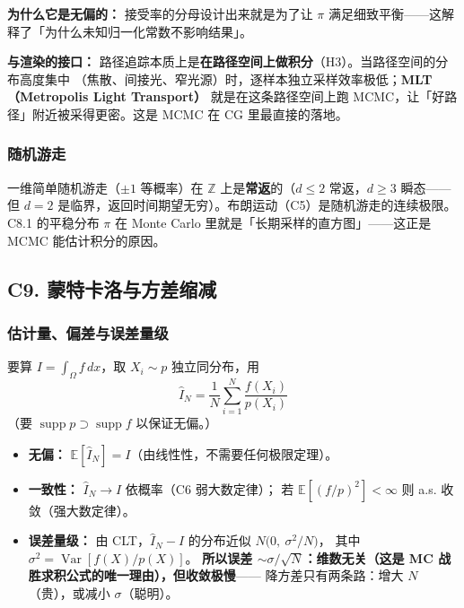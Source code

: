 \textbf{为什么它是无偏的：} 接受率的分母设计出来就是为了让 $\pi$ 满足细致平衡——这解释了「为什么未知归一化常数不影响结果」。

\textbf{与渲染的接口：} 路径追踪本质上是\textbf{在路径空间上做积分}（H3）。当路径空间的分布高度集中
（焦散、间接光、窄光源）时，逐样本独立采样效率极低；\textbf{MLT（Metropolis Light Transport）}
就是在这条路径空间上跑 MCMC，让「好路径」附近被采得更密。这是 MCMC 在 CG 里最直接的落地。

\subsubsection{随机游走}

一维简单随机游走（$\pm1$ 等概率）在 $\mathbb Z$ 上是\textbf{常返}的（$d\le2$ 常返，$d\ge3$ 瞬态——
但 $d=2$ 是临界，返回时间期望无穷）。布朗运动（C5）是随机游走的连续极限。
C8.1 的平稳分布 $\pi$ 在 Monte Carlo 里就是「长期采样的直方图」——这正是 MCMC 能估计积分的原因。

\subsection{C9. 蒙特卡洛与方差缩减}

\subsubsection{估计量、偏差与误差量级}

要算 $I=\int_\Omega f\,dx$，取 $X_i\sim p$ 独立同分布，用
\[
\hat I_N=\frac1N\sum_{i=1}^N\frac{f(X_i)}{p(X_i)}
\]
（要 $\operatorname{supp}p\supset\operatorname{supp}f$ 以保证无偏。）

\begin{itemize}
  \item \textbf{无偏：} $\mathbb E[\hat I_N]=I$（由线性性，不需要任何极限定理）。
  \item \textbf{一致性：} $\hat I_N\to I$ 依概率（C6 弱大数定律）；
        若 $\mathbb E[(f/p)^2]<\infty$ 则 a.s. 收敛（强大数定律）。
  \item \textbf{误差量级：} 由 CLT，$\hat I_N-I$ 的分布近似 $N\!\big(0,\ \sigma^2/N\big)$，
        其中 $\sigma^2=\operatorname{Var}[f(X)/p(X)]$。
        \textbf{所以误差 $\sim\sigma/\sqrt N$：维数无关（这是 MC 战胜求积公式的唯一理由），但收敛极慢}——
        降方差只有两条路：增大 $N$（贵），或减小 $\sigma$（聪明）。
\end{itemize}

